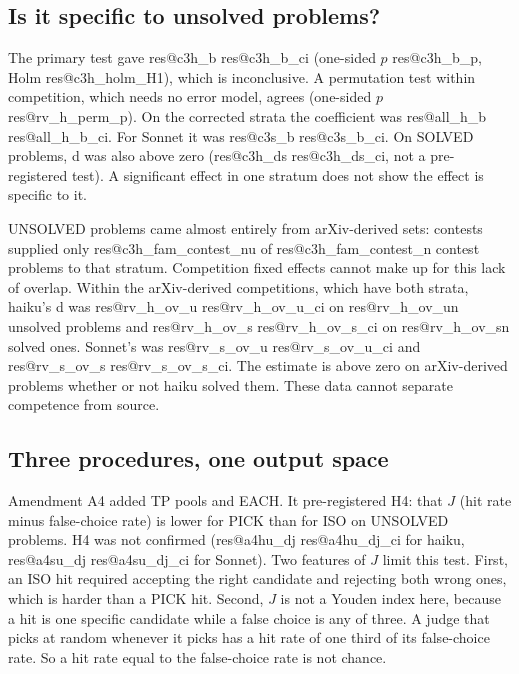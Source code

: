 \documentclass[10pt,twocolumn]{article}
\makeatletter
\newcommand{\res}[1]{\csname res@#1\endcsname}
\makeatother
\begin{document}
\subsection{Is it specific to unsolved problems?}
The primary test gave \res{c3h_b} \res{c3h_b_ci} (one-sided $p$ \res{c3h_b_p}, Holm \res{c3h_holm_H1}), which is inconclusive. A permutation test within competition, which needs no error model, agrees (one-sided $p$ \res{rv_h_perm_p}). On the corrected strata the coefficient was \res{all_h_b} \res{all_h_b_ci}. For Sonnet it was \res{c3s_b} \res{c3s_b_ci}. On SOLVED problems, d was also above zero (\res{c3h_ds} \res{c3h_ds_ci}, not a pre-registered test). A significant effect in one stratum does not show the effect is specific to it.

UNSOLVED problems came almost entirely from arXiv-derived sets: contests supplied only \res{c3h_fam_contest_nu} of \res{c3h_fam_contest_n} contest problems to that stratum. Competition fixed effects cannot make up for this lack of overlap. Within the arXiv-derived competitions, which have both strata, haiku's d was \res{rv_h_ov_u} \res{rv_h_ov_u_ci} on \res{rv_h_ov_un} unsolved problems and \res{rv_h_ov_s} \res{rv_h_ov_s_ci} on \res{rv_h_ov_sn} solved ones. Sonnet's was \res{rv_s_ov_u} \res{rv_s_ov_u_ci} and \res{rv_s_ov_s} \res{rv_s_ov_s_ci}. The estimate is above zero on arXiv-derived problems whether or not haiku solved them. These data cannot separate competence from source.

\subsection{Three procedures, one output space}\label{sec:aligned}
Amendment A4 added TP pools and EACH. It pre-registered H4: that $J$ (hit rate minus false-choice rate) is lower for PICK than for ISO on UNSOLVED problems. H4 was not confirmed (\res{a4hu_dj} \res{a4hu_dj_ci} for haiku, \res{a4su_dj} \res{a4su_dj_ci} for Sonnet). Two features of $J$ limit this test. First, an ISO hit required accepting the right candidate and rejecting both wrong ones, which is harder than a PICK hit. Second, $J$ is not a Youden index here, because a hit is one specific candidate while a false choice is any of three. A judge that picks at random whenever it picks has a hit rate of one third of its false-choice rate. So a hit rate equal to the false-choice rate is not chance.
\end{document}
